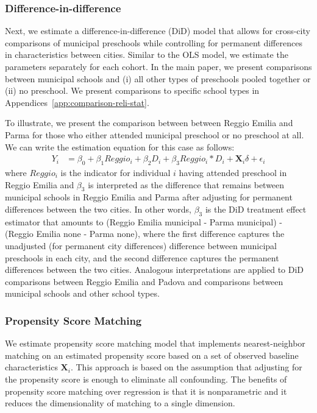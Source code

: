 \subsubsection{Difference-in-difference}  \label{subsubsection:DID}
Next, we estimate a difference-in-difference (DiD) model that allows for cross-city comparisons of municipal preschools while controlling for permanent differences in characteristics between cities. Similar to the OLS model, we estimate the parameters separately for each cohort. In the main paper, we present comparisons between municipal schools and (i) all other types of preschools pooled together or (ii) no preschool. We present comparisons to specific school types in Appendices~\ref{app:comparison-reli-stat}.

To illustrate, we present the comparison between between Reggio Emilia and Parma for those who either attended municipal preschool or no preschool at all. We can write the estimation equation for this case as follows:
\begin{eqnarray}  \label{eq:specific2}
Y_i & = \beta_0 + \beta_1 Reggio_i + \beta_2 D_i + \beta_3 Reggio_i * D_i + \bm{X}_i\delta + \epsilon_i
\end{eqnarray}
\noindent where $Reggio_i$ is the indicator for individual $i$ having attended preschool in Reggio Emilia and $\beta_3$ is interpreted as the difference that remains between municipal schools in Reggio Emilia and Parma after adjusting for permanent differences between the two cities. In other words, $\beta_3$ is the DiD treatment effect estimator that amounts to (Reggio Emilia municipal - Parma municipal) - (Reggio Emilia none - Parma none), where the first difference captures the unadjusted (for permanent city differences) difference between municipal preschools in each city, and the second difference captures the permanent differences between the two cities. Analogous interpretations are applied to DiD comparisons between Reggio Emilia and Padova and comparisons between municipal schools and other school types.


\subsubsection{Propensity Score Matching}  \label{subsubsection:psm}

We estimate propensity score matching model that implements nearest-neighbor matching on an estimated propensity score based on a set of observed baseline characteristics $\boldsymbol{X}_i$. This approach is based on the assumption that adjusting for the propensity score is enough to eliminate all confounding. The benefits of propensity score matching over regression is that it is nonparametric and it reduces the dimensionality of matching to a single dimension.

